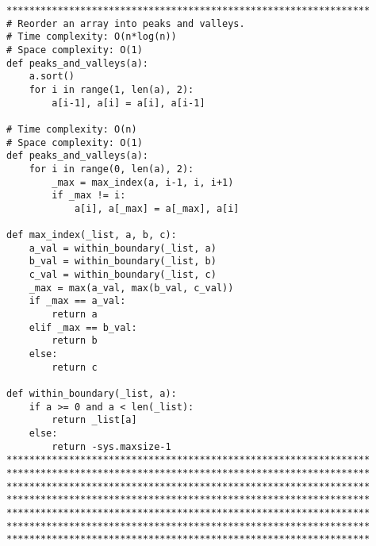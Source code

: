\documentclass[12pt]{article}
\begin{document}
\begin{lstlisting}
****************************************************************
# Reorder an array into peaks and valleys.
# Time complexity: O(n*log(n))
# Space complexity: O(1)
def peaks_and_valleys(a):
    a.sort()
    for i in range(1, len(a), 2):
        a[i-1], a[i] = a[i], a[i-1]

# Time complexity: O(n)
# Space complexity: O(1)
def peaks_and_valleys(a):
    for i in range(0, len(a), 2):
        _max = max_index(a, i-1, i, i+1)
        if _max != i:
            a[i], a[_max] = a[_max], a[i]

def max_index(_list, a, b, c):
    a_val = within_boundary(_list, a)
    b_val = within_boundary(_list, b)
    c_val = within_boundary(_list, c)
    _max = max(a_val, max(b_val, c_val))
    if _max == a_val:
        return a
    elif _max == b_val:
        return b
    else:
        return c

def within_boundary(_list, a):
    if a >= 0 and a < len(_list):
        return _list[a]
    else:
        return -sys.maxsize-1
****************************************************************
****************************************************************
****************************************************************
****************************************************************
****************************************************************
****************************************************************
****************************************************************




\end{lstlisting}
\end{document}
